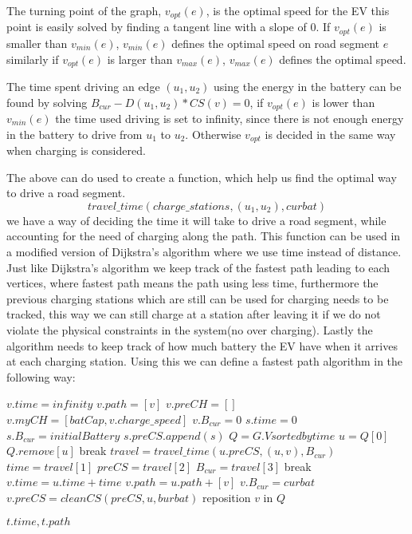 The turning point of the graph, $v_{opt}(e)$, is the optimal speed for the EV this point is easily solved by finding a tangent line with a slope of 0. If $v_{opt}(e)$ is smaller than $v_{min}(e)$, $v_{min}(e)$ defines the optimal speed on road segment $e$ similarly if $v_{opt}(e)$ is larger than $v_{max}(e)$, $v_{max}(e)$ defines the optimal speed.  

The time spent driving an edge $(u_1, u_2)$ using the energy in the battery can be found by solving $B_{cur} - D(u_1, u_2) * CS(v) = 0$, if $v_{opt}(e)$ is lower than $v_{min}(e)$ the time used driving is set to infinity, since there is not enough energy in the battery to drive from $u_1$ to $u_2$. Otherwise $v_{opt}$ is decided in the same way when charging is considered.   

The above can do used to create a function, which help us find the optimal way to drive a road segment. 
\[travel\_time(charge\_stations, (u_1, u_2), curbat) \]
we have a way of deciding the time it will take to drive a road segment, while accounting for the need of charging along the path. This function can be used in a modified version of Dijkstra's algorithm where we use time instead of distance. Just like Dijkstra's algorithm we keep track of the fastest path leading to each vertices, where fastest path means the path using less time, furthermore the previous charging stations which are still can be used for charging needs to be tracked, this way we can still charge at a station after leaving it if we do not violate the physical constraints in the system(no over charging). Lastly the algorithm needs to keep track of how much battery the EV have when it arrives at each charging station. Using this we can define a fastest path algorithm in the following way: 

\begin{algorithmic}
    		\State $v.time = infinity$
		\State $v.path = [v]$
    		\State $v.preCH = []$
		\State $v.myCH = [batCap, v.charge\_speed]$
		\State $v.B_{cur} = 0$
    	\EndFor
	\State $s.time = 0$
	\State $s.B_{cur} = initialBattery$
	\State $s.preCS.append(s)$	
	\State $Q = G.V sorted by time$
		\State $u = Q[0]$
		\State $Q.remove[u]$
		 break \EndIf
			\State $travel = travel\_time(u.preCS, (u, v), B_{cur})$
			\State $time = travel[1]$
			\State $preCS = travel[2]$
			\State $B_{cur} = travel[3]$
			 break \EndIf
				\State $v.time = u.time + time$
				\State $v.path = u.path + [v]$
				\State $v.B_{cur} = curbat$
				\State $v.preCS = cleanCS(preCS, u, burbat)$
				\State reposition $v$ in $Q$
			\EndIf

		\EndFor
	\EndWhile
	\State \Return $t.time, t.path$
\EndFunction
\end{algorithmic}\label{alg:fastest_path}

